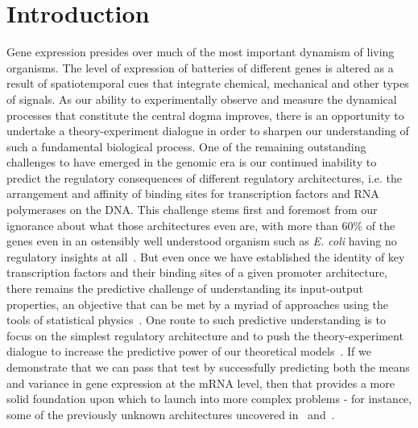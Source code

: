 \section{Introduction}

Gene expression presides over much of the most important dynamism of living
organisms. The level of expression of batteries of different genes is altered as
a result of spatiotemporal cues that integrate chemical, mechanical and other
types of signals. As our ability to experimentally observe and measure the
dynamical processes that constitute the central dogma improves, there is an
opportunity to undertake a theory-experiment dialogue in order to sharpen our
understanding of such a fundamental biological process. One of the remaining
outstanding challenges to have emerged in the genomic era is our continued
inability to predict the regulatory consequences of different regulatory
architectures, i.e. the arrangement and affinity of binding sites for
transcription factors and RNA polymerases on the DNA. This challenge stems first
and foremost from our ignorance about what those architectures even are, with
more than 60\% of the genes even in an ostensibly well understood organism such
as {\it E. coli} having no regulatory insights at all~\cite{Rydenfelt2014-2,
Belliveau2018, Ghatak2019, Santos_Zavaleta2019}. But even once we have
established the identity of key transcription factors and their binding sites of
a given promoter architecture, there remains the predictive challenge of
understanding its input-output properties, an objective that can be met by a
myriad of approaches using the tools of statistical physics~\cite{Ackers1982,
Shea1985, Buchler2003, Vilar2003a, Vilar2003b, Bintu2005a, Bintu2005c,
Kuhlman2007, Gertz2009, Sherman2012, Saiz2013, Ko1991, Peccoud1995, Record1996,
Kepler2001, Sanchez2008, Shahrezaei2008, Sanchez2011, Michel2010,
Iyer-Biswas2009}. One route to such predictive understanding is to focus on the
simplest regulatory architecture and to push the theory-experiment dialogue to
increase the predictive power of our theoretical models~\cite{Garcia2011,
Phillips2019}. If we demonstrate that we can pass that test by successfully
predicting both the means and variance in gene expression at the mRNA level,
then that provides a more solid foundation upon which to launch into more
complex problems - for instance, some of the previously unknown architectures
uncovered in~\cite{Belliveau2018} and~\cite{Ireland2020}.


